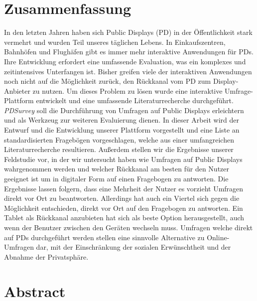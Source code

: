 
\section*{Zusammenfassung}

	In den letzten Jahren haben sich Public Displays (PD) in der {\"O}ffentlichkeit stark vermehrt und wurden Teil unseres t{\"a}glichen Lebens. In Einkaufszentren, Bahnh{\"o}fen und Flugh{\"a}fen gibt es immer mehr interaktive Anwendungen f{\"u}r PDs. Ihre Entwicklung erfordert eine umfassende Evaluation, was ein komplexes und zeitintensives Unterfangen ist. Bisher greifen viele der interaktiven Anwendungen noch nicht auf die M{\"o}glichkeit zur{\"u}ck, den R{\"u}ckkanal vom PD zum Display-Anbieter zu nutzen. Um dieses Problem zu l{\"o}sen wurde eine interaktive Umfrage-Plattform entwickelt und eine umfassende Literaturrecherche durchgef{\"u}hrt. \textit{PDSurvey} soll die Durchf{\"u}hrung von Umfragen auf Public Displays erleichtern und als Werkzeug zur weiteren Evaluierung dienen. In dieser Arbeit wird der Entwurf und die Entwicklung unserer Plattform vorgestellt und eine Liste an standardisierten Frageb{\"o}gen vorgeschlagen, welche aus einer umfangreichen Literaturrecherche resultieren. Au{\ss}erdem stellen wir die Ergebnisse unserer Feldstudie vor, in der wir untersucht haben wie Umfragen auf Public Displays wahrgenommen werden und welcher R{\"u}ckkanal am besten f{\"u}r den Nutzer geeignet ist um in digitaler Form auf einen Fragebogen zu antworten.
	Die Ergebnisse lassen folgern, dass eine Mehrheit der Nutzer es vorzieht Umfragen direkt vor Ort zu beantworten. Allerdings hat auch ein Viertel sich gegen die M{\"o}glichkeit entschieden, direkt vor Ort auf den Fragebogen zu antworten. Ein Tablet als R{\"u}ckkanal anzubieten hat sich als beste Option herausgestellt, auch wenn der Benutzer zwischen den Ger{\"a}ten wechseln muss. Umfragen welche direkt auf PDs durchgef{\"u}hrt werden stellen eine sinnvolle Alternative zu Online-Umfragen dar, mit der Einschr{\"a}nkung der sozialen Erw{\"u}nschtheit und der Abnahme der Privatsph{\"a}re.


\section*{Abstract}

